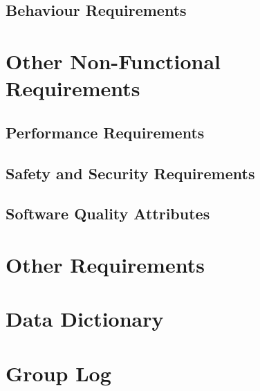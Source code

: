 \documentclass{report}
\begin{document}
\section{Behaviour Requirements}




\chapter{Other Non-Functional Requirements}

\section{Performance Requirements}

\section{Safety and Security Requirements}

\section{Software Quality Attributes}




\chapter{Other Requirements}

\begin{appendices}
    \chapter{Data Dictionary}
    \chapter{Group Log}
\end{appendices}
\end{document}
